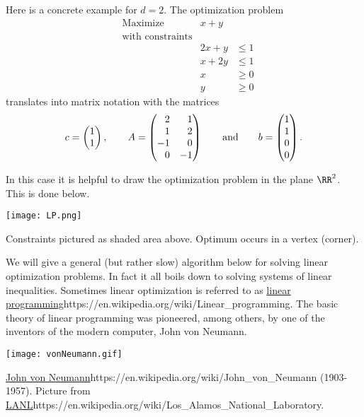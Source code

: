 \documentclass{article}
\begin{document}
  \begin{example}\label{exlinopt}
  
     Here is a concrete example for $d = 2$. The optimization problem
  \begin{align*}
    &\text{Maximize} &x + y&\\
    &\text{with constraints}\\
    &&2 x + y &\leq 1\\
    &&x + 2 y &\leq 1\\
    &&x &\geq 0\\
    &&y &\geq 0
  \end{align*}
  translates into matrix notation with the matrices
  \newcommand{\mi}{\hphantom{-}}
  $$
  c = \begin{pmatrix} 1 \\ 1 \end{pmatrix}, \qquad
  A = \begin{pmatrix} \mi 2 & \mi 1 \\ \mi 1 & \mi 2 \\ -1 & \mi 0 \\ \mi 0 & - 1\end{pmatrix}\qquad \text{and}\qquad
  b = \begin{pmatrix} 1 \\ 1 \\ 0 \\ 0 \end{pmatrix}.
  $$

  In this case it is helpful to draw the optimization problem in the plane $\RR^2$. This is done below.
  
  \texttt{[image: LP.png]}
  \begin{center}
    Constraints pictured as shaded area above. Optimum occurs in a vertex (corner).
    \end{center}
  
  \end{example}
  


  
  We will give a general (but rather slow) algorithm below for solving
  linear optimization problems. In fact it all boils down to solving
  systems of linear inequalities. Sometimes linear optimization is
  referred to as \url{linear
    programming}{https://en.wikipedia.org/wiki/Linear_programming}. The
  basic theory of linear programming was pioneered, among others, by
  one of the inventors of the modern computer, John von Neumann.

  
\texttt{[image: vonNeumann.gif]}
\begin{center}
  \url{John von Neumann}{https://en.wikipedia.org/wiki/John_von_Neumann} (1903-1957). Picture from \url{LANL}{https://en.wikipedia.org/wiki/Los_Alamos_National_Laboratory}.
\end{center}
\end{document}
